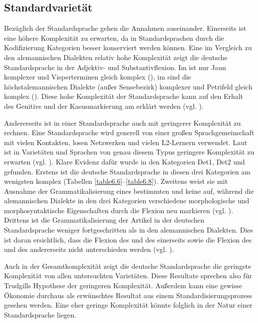 \subsection{Standardvarietät}\label{6.6.4}

Bezüglich der Standardsprache gehen die Annahmen auseinander. Einerseits ist eine höhere Komplexität zu erwarten, da in Standardsprachen durch die Kodifizierung Kategorien besser konserviert werden können. Eine im Vergleich zu den alemannischen Dialekten relativ hohe Komplexität zeigt die deutsche Standardsprache in der Adjektiv- und Substantivflexion. Im  ist nur Jaun komplexer und Visperterminen gleich komplex (), im  sind die höchstalemannischen Dialekte (außer Sensebezirk) komplexer und Petrifeld gleich komplex (). Diese hohe Komplexität der Standardsprache kann auf den Erhalt des Genitivs und der Kasusmarkierung am  erklärt werden (vgl. ).

Andererseits ist in einer Standardsprache auch mit geringerer Komplexität zu rechnen. Eine Standardsprache wird generell von einer großen Sprachgemeinschaft mit vielen Kontakten, losen Netzwerken und vielen L2-Ler\-nern verwendet. Laut \citet{Trudgill2011} ist in Varietäten und Sprachen von genau diesem Typus geringere Komplexität zu erwarten (vgl. ). Klare Evidenz dafür wurde in den Kategorien Det1, Det2 und  gefunden. Erstens ist die deutsche Standardsprache in diesen drei Kategorien am wenigsten komplex (Tabellen \ref{table6.6}–\ref{table6.8}). Zweitens weist sie mit Ausnahme der Grammatikalisierung eines bestimmten und  keine  auf, während die alemannischen Dialekte in den drei Kategorien verschiedene morphologische und morphosyntaktische Eigenschaften durch die Flexion neu markieren (vgl. ). Drittens ist die Grammatikalisierung der Artikel in der deutschen Standardsprache weniger fortgeschritten als in den alemannischen Dialekten. Dies ist daran ersichtlich, dass die Flexion des  und des  einerseits sowie die Flexion des  und des  andererseits nicht unterschieden werden (vgl. ).

Auch in der Gesamtkomplexität zeigt die deutsche Standardsprache die geringste Komplexität von allen untersuchten Varietäten. Diese Resultate sprechen also für Trudgills Hypothese der geringeren Komplexität. Außerdem kann eine gewisse Ökonomie durchaus als erwünschtes Resultat aus einem Standardisierungsprozess gesehen werden. Eine eher geringe Komplexität könnte folglich in der Natur einer Standardsprache liegen.


